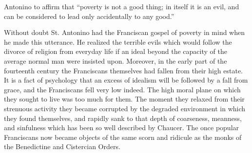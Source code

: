 \documentclass{book}
\begin{document}
Antonino to affirm that “poverty is not a good thing; in itself it is an evil, and can be considered to lead only accidentally to any good.”\footnotemark[1]

Without doubt St. Antonino had the Franciscan gospel of poverty in mind when he made this utterance. He realized the terrible evils which would follow the divorce of religion from everyday life if an ideal beyond the capacity of the average normal man were insisted upon. Moreover, in the early part of the fourteenth century the Franciscans themselves had fallen from their high estate. It is a fact of psychology that an excess of idealism will be followed by a fall from grace, and the Franciscans fell very low indeed. The high moral plane on which they sought to live was too much for them. The moment they relaxed from their strenuous activity they became corrupted by the degraded environment in which they found themselves, and rapidly sank to that depth of coarseness, meanness, and sinfulness which has been so well described by Chaucer. The once popular Franciscans now became objects of the same scorn and ridicule as the monks of the Benedictine and Cistercian Orders.
\end{document}
